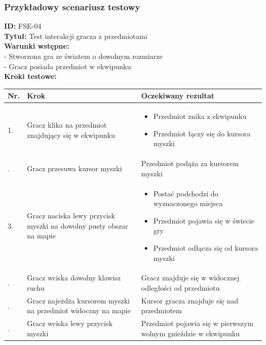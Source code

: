 \documentclass{article}
\begin{document}
\subsubsection{Przykładowy scenariusz testowy}
\textbf{ID:} FSE-04 \\
\textbf{Tytuł:} Test interakcji gracza z przedmiotami \\
\textbf{Warunki wstępne:} \\
- Stworzona gra ze światem o dowolnym rozmiarze \\
- Gracz posiada przedmiot w ekwipunku \\
\textbf{Kroki testowe:} \\
\begin{center}
\begin{tabularx}{\textwidth} {
| >{\centering\arraybackslash}p{}
| >{\centering\arraybackslash}X
| >{\centering\arraybackslash}X | }
\hline
Nr. & Krok & Oczekiwany rezultat \\
\hline
\begin{center}
1.
\end{center} &
\begin{center}
Gracz klika na przedmiot znajdujący się w ekwipunku
\end{center}
&
\begin{itemize}
\item Przedmiot znika z ekwipunku
\item Przedmiot łączy się do kursora myszki
\end{itemize} \\
\hline
2. & Gracz przesuwa kursor myszki & Przedmiot podąża za kursorem myszki \\
\hline
\begin{center}
3.
\end{center} &
\begin{center}
Gracz naciska lewy przycisk myszki na dowolny pusty obszar na mapie
\end{center}
&
\begin{itemize}
\item Postać podchodzi do wyznaczonego miejsca
\item Przedmiot pojawia się w świecie gry
\item Przedmiot odłącza się od kursora myszki
\end{itemize} \\
\hline
4. & Gracz wciska dowolny klawisz ruchu & Gracz znajduje się w widocznej odległości od przedmiotu \\
\hline
5. & Gracz najeżdża kursorem myszki na przedmiot widoczny na mapie & Kursor gracza znajduje się nad przedmiotem \\
\hline
6. & Gracz wciska lewy przycisk myszki & Przedmiot pojawia się w pierwszym wolnym gnieździe w ekwipunku \\
\hline
\end{tabularx}
\end{center}
\end{document}
